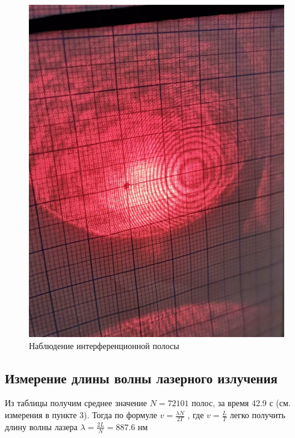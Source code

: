 \begin{figure}[h]
\begin{minipage}[b]{0.4\textwidth}
        \includegraphics[width=\textwidth]{pics/stripes.png}
        \caption{Наблюдение интерференционной полосы}
      \end{minipage}    
    \end{figure}    
    
    
    \begin{table}[h!]
      \centering
      
      \caption{}
      \label{nu1}
    \end{table}



\subsection{Измерение длины волны лазерного излучения}

Из таблицы получим среднее значение $N = 72101$ полос, за время 42.9 с (см. измерения в пункте 3). Тогда по формуле $v = \frac{\lambda N}{2T}$ , где $v = \frac{L}{T}$ легко получить длину волны лазера $\lambda = \frac{2L}{N} = 887.6$ нм


